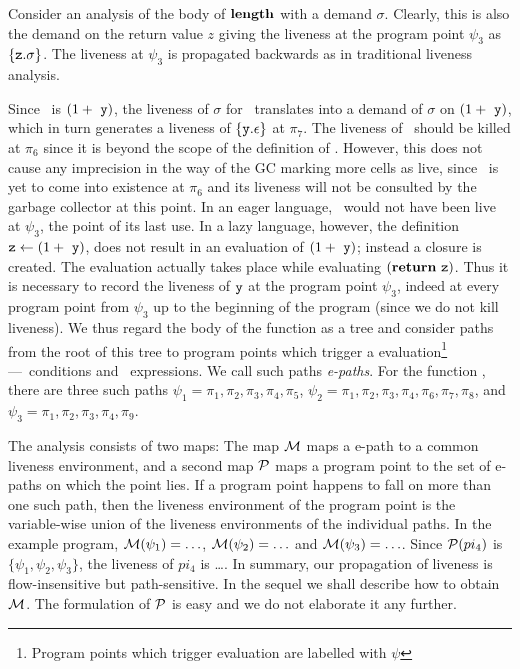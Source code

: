 \documentclass[9pt]{sigplanconf}
\newcommand{\comment}[1]{{\color{Myblue}{(#1)}}}
\begin{document}
Consider  an analysis of  the body  of $\mathbf{length}$  with a  demand $\sigma$.
Clearly, this is also the demand on the return value $z$ giving the
liveness  at  the  program point  $\psi_3$ as $\{\mbox{\tt z}.\sigma\}$.   
The  liveness at $\psi_3$  is  propagated  backwards  as  in  traditional
liveness analysis.

Since   \pz\  is  $(1 + ~\mbox{\tt y})$,  the   liveness  of   $\sigma$  for
\pz\ translates  into a demand  of $\sigma$ on $(1+~\mbox{\tt y})$,  which in
turn  generates  a  liveness  of $\{\mbox{\tt y}.\epsilon\}$  at
$\pi_7$.  The liveness of \py\ should be killed at $\pi_6$ since it is
beyond the scope of the definition of \py.  However, this does not cause any imprecision
in the way of the GC marking  more cells as live, since \py\ is yet to
come into existence at $\pi_6$  and its liveness will not be consulted
by the garbage collector at this point.
In an eager language, \py\ would not have been live at $\psi_3$, the
point of  its last  use. In a  lazy language, however,  the definition
$\mbox{\tt z}  \leftarrow (1+~\mbox{\tt y})$,  does  not result  in  an evaluation  of
$(1+~\mbox{\tt y})$; instead  a closure is created.   The evaluation actually
takes place while evaluating  $(\mbox{$\mathbf{ return}$}~\mbox{\tt z})$. Thus it is necessary to
record the liveness  of $\mbox{\tt y}$ at the program  point $\psi_3$, indeed at
every program  point from $\psi_3$ up  to the beginning  of the program
(since  we do  not kill  liveness).  We  thus regard  the body  of the
function as  a tree and consider paths  from the root of  this tree to
program  points  which  trigger  a evaluation\footnote{Program points
  which trigger evaluation are labelled with $\psi$}---\SIF\  conditions  and
\RETURN\  expressions.  We  call such  paths {\em
  e-paths}. \comment{Update the e-path labels}  For the
function \length, there are three such paths $\psi_1 = \pi_1, \pi_2, \pi_3,
\pi_4,  \pi_5$, $\psi_2  =  \pi_1, \pi_2,  \pi_3,  \pi_4, \pi_6,  \pi_7,
\pi_8$, and $\psi_3 = \pi_1, \pi_2, \pi_3, \pi_4, \pi_9$.

The analysis  consists of  two maps: The  map $\cal{M}$ maps  a e-path to a common liveness environment, and a second map $\cal{P}$ maps
a program  point to the set of  e-paths on which  the point lies.
If a  program  point happens to fall  on more than one  such path, then
the  liveness environment of  the program  point is  the variable-wise
union of  the liveness environments  of the individual paths.   In the
example program, ${\cal M}(\psi_1)= \ldots$, ${\cal M}(\psi_2)=\ldots$ and
${\cal M}(\psi_3)=  \ldots$.  Since  ${\cal P}(pi_4)$ is  $\lbrace \psi_1,
\psi_2, \psi_3 \rbrace$, the liveness  of $pi_4$ is \ldots.  In summary,
our propagation of liveness is flow-insensitive but path-sensitive.
In the sequel
we  shall  describe  how  to  obtain $\cal{M}$.   The  formulation  of
$\cal{P}$ is easy and we do not elaborate it any further.
\end{document}
